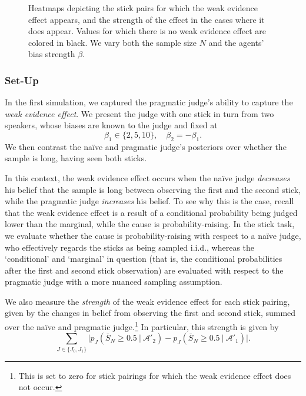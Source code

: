 \documentclass[10pt,letterpaper]{article}
\begin{document}
\begin{figure}[h]
\begin{subfigure}{0.3\linewidth}
\end{subfigure}
\caption{Heatmaps depicting the stick pairs for which the weak evidence effect appears, and the strength
of the effect in the cases where it does appear. Values for which there is no weak evidence effect are colored
in black. We vary both the sample size $N$ and the agents' bias strength $\beta$.} 
\label{fig:wee}
\end{figure}

\subsubsection{Set-Up}
In the first simulation, we captured the pragmatic judge's ability to capture the \textit{weak evidence effect}. We 
present the judge with one stick in turn from two speakers, whose biases are known to the judge and fixed at
\begin{equation}
\beta_1 \in \{2, 5, 10\}, \quad \beta_2 = -\beta_1.
\end{equation}
We then contrast the na\"ive and pragmatic judge's posteriors over whether the
sample is long, having seen both sticks.

In this context, the weak evidence effect occurs when the na\"ive judge \textit{decreases} his belief that the sample is
long between observing the first and the second stick, while the pragmatic judge \textit{increases} his belief. To see
why this is the case, recall that the weak evidence effect is a result of a conditional probability being judged lower than the 
marginal, while the cause is probability-raising. In the stick task, we evaluate whether the cause is probability-raising with
respect to a na\"ive judge, who effectively regards the sticks as being sampled i.i.d., whereas the `conditional' and `marginal' in question
(that is, the conditional probabilities after the first and second stick observation) are evaluated with respect to the pragmatic 
judge with a more nuanced sampling assumption.

We also measure the \textit{strength} of the weak evidence effect for each stick pairing, given by the changes in
belief from observing the first and second stick, summed over the na\"ive and pragmatic judge.\footnote{This is 
set to zero for stick pairings for which the weak evidence effect does not occur.} In particular, this strength is given
by
\begin{equation}
\sum_{J \in \{J_0, J_1\}} \lvert p_J ( \bar{S}_N \ge 0.5 \ | \ \mathcal{A}'_2) - p_J ( \bar{S}_N \ge 0.5 \ | \ \mathcal{A}'_1) \rvert .
\end{equation}
\end{document}
